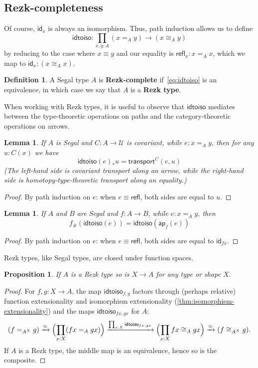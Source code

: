 \documentclass{amsart}
\theoremstyle{plain}
\newtheorem{prop}[thm]{Proposition}
\newtheorem{lem}[thm]{Lemma}
\theoremstyle{definition}
\newtheorem{defn}[thm]{Definition}
\theoremstyle{remark}
\numberwithin{equation}{section}
\newcommand{\extfn}[1]{{#1}_\#}
\newcommand{\jdeq}{\equiv}
\newcommand{\univtype}{\mathcal{U}}
\newcommand{\refl}{\mathsf{refl}}
\newcommand{\idtoiso}{\mathsf{idtoiso}}
\newcommand{\idarr}[1]{\mathsf{id}_{#1}}
\newcommand{\transport}[3]{\mathsf{transport}^{#1}(#2,#3)}%
\newcommand{\ap}{\mathsf{ap}}                             %
\newcommand{\covtr}[1]{{#1}_*}  %
\newcommand{\Parens}[1]{\Bigl(#1\Bigr)}
\let\xto\xrightarrow
\begin{document}
\subsection{Rezk-completeness}
\label{sec:completeness}

Of course, $\idarr x$ is always an isomorphism.
Thus, path induction allows us to define
\begin{equation}
  \idtoiso:\prod_{x,y :A} (x =_A y) \to (x\cong_A y)\label{eq:idtoiso}
\end{equation}
by reducing to the case where $x \jdeq y$ and our equality is $\refl_x : x =_A x$, which we map to $\idarr x : (x\cong_A x)$.

\begin{defn}\label{defn:rezk-complete} A Segal type  $A$ is \textbf{Rezk-complete}  if~\eqref{eq:idtoiso} is an equivalence, in which case we say that $A$ is a \textbf{Rezk type}.
\end{defn}

When working with Rezk types, it is useful to observe that $\idtoiso$ mediates between the type-theoretic operations on paths and the category-theoretic operations on arrows.

\begin{lem}\label{thm:idtoiso-trans}
  If $A$ is Segal and $C:A\to\univtype$ is covariant, while $e:x=_A y$, then for any $u:C(x)$ we have
  \[ \covtr{\idtoiso(e)}{u}= \transport{C}{e}{u} \]
  (The left-hand side is covariant transport along an arrow, while the right-hand side is homotopy-type-theoretic transport along an equality.)
\end{lem}
\begin{proof}
  By path induction on $e$: when $e\jdeq \refl$, both sides are equal to $u$.
\end{proof}

\begin{lem}\label{thm:idtoiso-ap}
  If $A$ and $B$ are Segal and $f:A\to B$, while $e:x=_A y$, then
  \[ \extfn f(\idtoiso(e)) = \idtoiso(\ap_f(e)) \]
\end{lem}
\begin{proof}
  By path induction on $e$: when $e\jdeq \refl$, both sides are equal to $\idarr{fx}$.
\end{proof}

Rezk types, like Segal types, are closed under function spaces.

\begin{prop} If $A$ is a Rezk type so is $X \to A$ for any type or shape $X$.
\end{prop}
\begin{proof}
For $f,g:X\to A$, the map $\idtoiso_{f,g}$ factors through (perhaps relative) function extensionality and isomorphism extensionality (\cref{thm:isomorphism-extensionality}) and the maps $\idtoiso_{fx,gx}$ for $A$:
\[ 
(f =_{A^X} g) \xto{\simeq} \Parens{\prod_{x :X} (fx =_A gx)} \xto{\prod_{x:X} \idtoiso_{fx,gx}} \Parens{\prod_{x :X} fx \cong_A gx} \xto{\simeq} (f \cong_{A^X} g).\]
If $A$ is a Rezk type, the middle map is an equivalence, hence so is the composite.
\end{proof}
\end{document}

